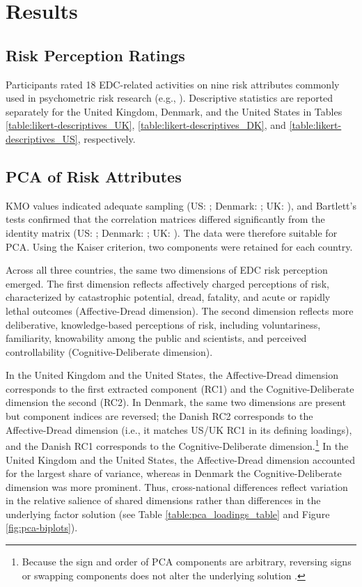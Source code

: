 \section{Results}

\subsection{Risk Perception Ratings}
Participants rated 18 EDC-related activities on nine risk attributes commonly used in psychometric risk research (e.g., \citealp{fischhoff1978safe,slovic1987perception}). Descriptive statistics are reported separately for the United Kingdom, Denmark, and the United States in Tables \ref{table:likert-descriptives_UK}, \ref{table:likert-descriptives_DK}, and \ref{table:likert-descriptives_US}, respectively.

\subsection{PCA of Risk Attributes}
KMO values indicated adequate sampling (US: ; Denmark: ; UK: ), and Bartlett's tests confirmed that the correlation matrices differed significantly from the identity matrix (US: ; Denmark: ; UK: ). The data were therefore suitable for PCA. Using the Kaiser criterion, two components were retained for each country.

Across all three countries, the same two dimensions of EDC risk perception emerged. The first dimension reflects affectively charged perceptions of risk, characterized by catastrophic potential, dread, fatality, and acute or rapidly lethal outcomes (Affective-Dread dimension). The second dimension reflects more deliberative, knowledge-based perceptions of risk, including voluntariness, familiarity, knowability among the public and scientists, and perceived controllability (Cognitive-Deliberate dimension).

In the United Kingdom and the United States, the Affective-Dread dimension corresponds to the first extracted component (RC1) and the Cognitive-Deliberate dimension the second (RC2). In Denmark, the same two dimensions are present but component indices are reversed; the Danish RC2 corresponds to the Affective-Dread dimension (i.e., it matches US/UK RC1 in its defining loadings), and the Danish RC1 corresponds to the Cognitive-Deliberate dimension.\footnote{Because the sign and order of PCA components are arbitrary, reversing signs or swapping components does not alter the underlying solution \citep{jolliffe2016principal}.} In the United Kingdom and the United States, the Affective-Dread dimension accounted for the largest share of variance, whereas in Denmark the Cognitive-Deliberate dimension was more prominent. Thus, cross-national differences reflect variation in the relative salience of shared dimensions rather than differences in the underlying factor solution (see Table \ref{table:pca_loadings_table} and Figure \ref{fig:pca-biplots}).

